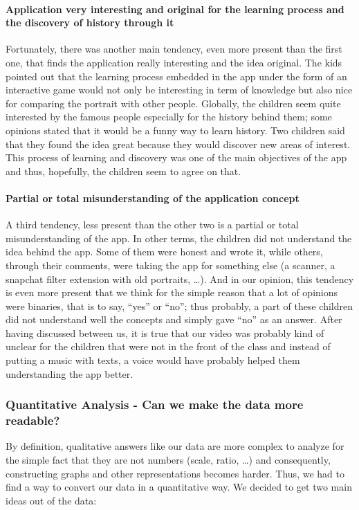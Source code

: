 \documentclass[12pt]{scrartcl}
\begin{document}
				\paragraph{Application very interesting and original for the learning process and the discovery of history through it}
					Fortunately, there was another main tendency, even more present than the first one, that finds the application really interesting and the idea original. The kids pointed out that the learning process embedded in the app under the form of an interactive game would not only be interesting in term of knowledge but also nice for comparing the portrait with other people. Globally, the children seem quite interested by the famous people especially for the history behind them; some opinions stated that it would be a funny way to learn history. Two children said that they found the idea great because they would discover new areas of interest. This process of learning and discovery was one of the main objectives of the app and thus, hopefully, the children seem to agree on that. 

				\paragraph{Partial or total misunderstanding of the application concept}
					A third tendency, less present than the other two is a partial or total misunderstanding of the app. In other terms, the children did not understand the idea behind the app. Some of them were honest and wrote it, while others, through their comments, were taking the app for something else (a scanner, a snapchat filter extension with old portraits, …). And in our opinion, this tendency is even more present that we think for the simple reason that a lot of opinions were binaries, that is to say, ``yes'' or ``no''; thus probably, a part of these children did not understand well the concepts and simply gave ``no'' as an answer. After having discussed between us, it is true that our video was probably kind of unclear for the children that were not in the front of the class and instead of putting a music with texts, a voice would have probably helped them understanding the app better.
						
		\subsubsection*{Quantitative Analysis - Can we make the data more readable?}

			By definition, qualitative answers like our data are more complex to analyze for the simple fact that they are not numbers (scale, ratio, …) and consequently, constructing graphs and other representations becomes harder. Thus, we had to find a way to convert our data in a quantitative way. We decided to get two main ideas out of the data:\\
			
\end{document}

